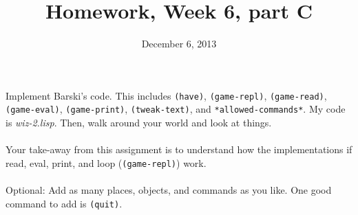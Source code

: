 \documentclass{article}
\title{Homework, Week 6, part C}
\date{December 6, 2013}
\begin{document}
\maketitle{}

\paragraph{}Implement Barski's code. This includes \texttt{(have)}, \texttt{(game-repl)}, \texttt{(game-read)}, \texttt{(game-eval)}, \texttt{(game-print)}, \texttt{(tweak-text)}, and \texttt{*allowed-commands*}. My code is \textit{wiz-2.lisp}. Then, walk around your world and look at things.

\paragraph{}Your take-away from this assignment is to understand how the implementations if read, eval, print, and loop (\texttt{(game-repl)}) work.

\paragraph{}Optional: Add as many places, objects, and commands as you like. One good command to add is \texttt{(quit)}.
\end{document}
